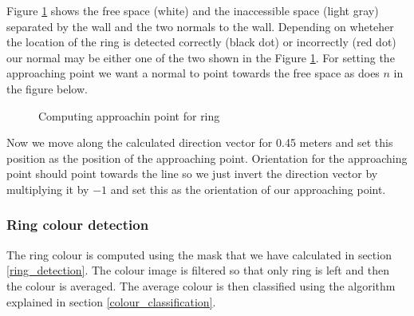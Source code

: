 \documentclass[12pt,a4paper]{article}
\begin{document}
	Figure \ref{fig:ring_approaching_point_computation} shows the free space (white) and the inaccessible space (light gray) separated by the wall and the two normals to the wall. Depending on wheteher the location of the ring is detected correctly (black dot) or incorrectly (red dot) our normal may be either one of the two shown in the Figure \ref{fig:ring_approaching_point_computation}. For setting the approaching point we want a normal to point towards the free space as does $n$ in the figure below. \\

	\begin{figure}[H]
		\centering
		\caption{Computing approachin point for ring}
		\label{fig:ring_approaching_point_computation}
	\end{figure}

	Now we move along the calculated direction vector for 0.45 meters and set this position as the position of the approaching point. Orientation for the approaching point should point towards the line so we just invert the direction vector by multiplying it by $-1$ and set this as the orientation of our approaching point. \\

	\subsubsection{Ring colour detection}
	The ring colour is computed using the mask that we have calculated in section \ref{ring_detection}. The colour  image is filtered so that only ring is left and then the colour is averaged. The average colour is then classified using the algorithm explained in section \ref{colour_classification}. \\
	
\end{document}
